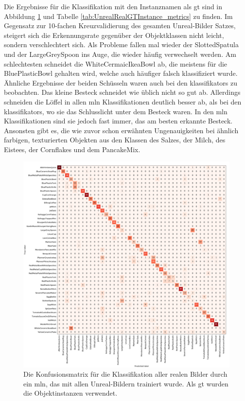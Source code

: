 Die Ergebnisse für die Klassifikation mit den Instanznamen als \gls{gt} sind in Abbildung \ref{fig:UnrealRealGTInstance_confMatrix} und Tabelle \ref{tab:UnrealRealGTInstance_metrics} zu finden. Im Gegensatz zur 10-fachen Kreuzvalidierung des gesamten Unreal-Bilder Satzes, steigert sich die Erkennungsrate gegenüber der Objektklassen nicht leicht, sondern verschlechtert sich. Als Probleme fallen mal wieder der SlottedSpatula und der LargeGreySpoon ins Auge, die wieder häufig verwechselt werden. Am schlechtesten schneidet die WhiteCermaicIkeaBowl ab, die meistens für die BluePlasticBowl gehalten wird, welche auch häufiger falsch klassifiziert wurde. Ähnliche Ergebnisse der beiden Schüsseln waren auch bei den \glspl{klassifikator} zu beobachten. Das kleine Besteck schneidet wie üblich nicht so gut ab. Allerdings schneiden die Löffel in allen \gls{mln} Klassifikationen deutlich besser ab, als bei den \glspl{klassifikator}, wo sie das Schlusslicht unter dem Besteck waren. In den \gls{mln} Klassifikationen sind sie jedoch fast immer, das am besten erkannte Besteck. Ansonsten gibt es, die wie zuvor schon erwähnten Ungenauigkeiten bei ähnlich farbigen, texturierten Objekten aus den Klassen des Salzes, der Milch, des Eistees, der Cornflakes und dem PancakeMix.

\begin{figure}
	\includegraphics[scale=.3]{img/chapter6/UnrealRealGTInstance.png}
\caption[Konfusionsmatrix der Objektinstanzen Klassifikation mit Unreal-Trainingsset und realem Testset]{Die Konfusionsmatrix für die Klassifikation aller realen Bilder durch ein \gls{mln}, das mit allen Unreal-Bildern trainiert wurde. Als \gls{gt} wurden die Objektinstanzen verwendet.}
\label{fig:UnrealRealGTInstance_confMatrix}
\end{figure}  

